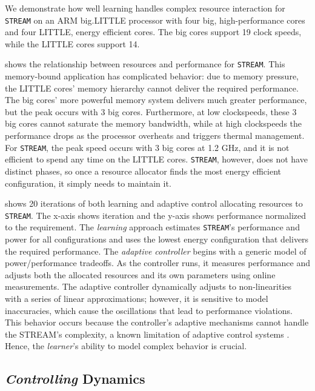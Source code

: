 We demonstrate how well learning handles complex resource interaction
for \texttt{STREAM} on an ARM big.LITTLE processor with four big,
high-performance cores and four LITTLE, energy efficient cores.  The
big cores support 19 clock speeds, while the LITTLE cores support 14.


 shows the relationship between resources
and performance for \texttt{STREAM}.  This memory-bound application
has complicated behavior: due to memory pressure, the LITTLE cores'
memory hierarchy cannot deliver the required performance.  The big
cores' more powerful memory system delivers much greater performance,
but the peak occurs with 3 big cores.  Furthermore, at low
clockspeeds, these 3 big cores cannot saturate the memory bandwidth,
while at high clockspeeds the performance drops as the processor
overheats and triggers thermal management.  For \texttt{STREAM}, the
peak speed occurs with 3 big cores at 1.2 GHz, and it is not efficient
to spend any time on the LITTLE cores.  \texttt{STREAM}, however, does
not have distinct phases, so once a resource allocator finds the most
energy efficient configuration, it simply needs to maintain it.

 shows 20 iterations of both learning
\cite{LEO} and adaptive control \cite{POET} allocating resources to
\texttt{STREAM}.  The x-axis shows iteration and the y-axis shows
performance normalized to the requirement.  The \emph{learning}
approach estimates \texttt{STREAM}'s performance and power for all
configurations and uses the lowest energy configuration that delivers
the required performance.  The \emph{adaptive controller} begins with
a generic model of power/performance tradeoffs.  As the controller
runs, it measures performance and adjusts both the allocated resources
and its own parameters using online measurements.  The adaptive
controller dynamically adjusts to non-linearities with a series of
linear approximations; however, it is sensitive to model inaccuracies,
which cause the oscillations that lead to performance violations.
This behavior occurs because the controller's adaptive mechanisms
cannot handle the STREAM's complexity, a known limitation of adaptive
control systems \cite{ControlWare,POET,ICSE2014}.  Hence, the
\emph{learner}'s ability to model complex behavior is crucial.

\subsection{\emph{Controlling} Dynamics}

